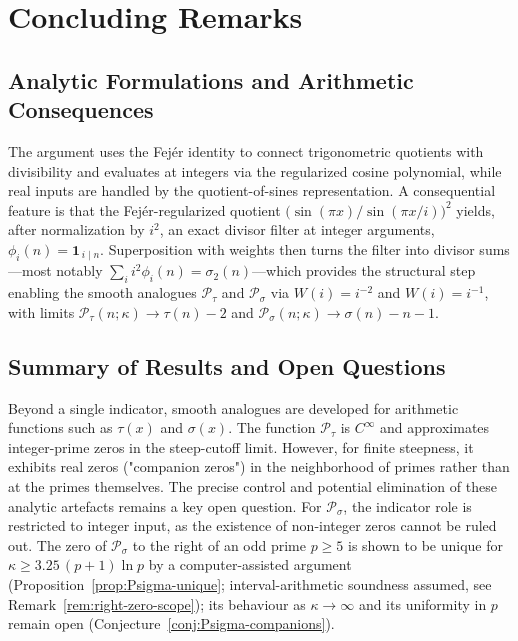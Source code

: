 \section{Concluding Remarks}

\subsection{Analytic Formulations and Arithmetic Consequences}
The argument uses the Fejér identity to connect trigonometric quotients with divisibility and evaluates at integers via the regularized cosine polynomial, while real inputs are handled by the quotient-of-sines representation. A consequential feature is that the Fejér-regularized quotient \(\bigl(\sin(\pi x)/\sin(\pi x/i)\bigr)^2\) yields, after normalization by \(i^2\), an exact divisor filter at integer arguments, \(\phi_i(n)=\mathbf{1}_{\,i\mid n}\). Superposition with weights then turns the filter into divisor sums—most notably \(\sum_i i^{2}\phi_i(n)=\sigma_{2}(n)\)—which provides the structural step enabling the smooth analogues \(\mathcal{P}_{\tau}\) and \(\mathcal{P}_{\sigma}\) via \(W(i)=i^{-2}\) and \(W(i)=i^{-1}\), with limits \(\mathcal{P}_{\tau}(n;\kappa)\to\tau(n)-2\) and \(\mathcal{P}_{\sigma}(n;\kappa)\to\sigma(n)-n-1\).

\subsection{Summary of Results and Open Questions}
Beyond a single indicator, smooth analogues are developed for arithmetic functions such as $\tau(x)$ and $\sigma(x)$. The function $\mathcal{P}_{\tau}$ is $C^\infty$ and approximates integer-prime zeros in the steep-cutoff limit. However, for finite steepness, it exhibits real zeros ("companion zeros") in the neighborhood of primes rather than at the primes themselves. The precise control and potential elimination of these analytic artefacts remains a key open question. For $\mathcal{P}_{\sigma}$, the indicator role is restricted to integer input, as the existence of non-integer zeros cannot be ruled out. The zero of $\mathcal P_\sigma$ to the right of an odd prime $p\ge5$ is shown to be unique for $\kappa\ge3.25\,(p+1)\ln p$ by a computer-assisted argument (Proposition~\ref{prop:Psigma-unique}; interval-arithmetic soundness assumed, see Remark~\ref{rem:right-zero-scope}); its behaviour as $\kappa\to\infty$ and its uniformity in $p$ remain open (Conjecture~\ref{conj:Psigma-companions}).

